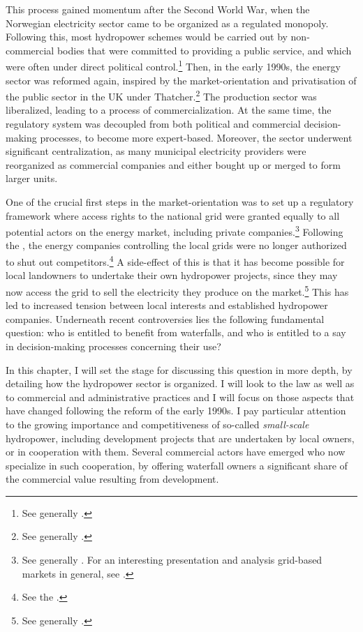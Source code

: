 This process gained momentum after the Second World War, when the Norwegian electricity sector came to be organized as a regulated monopoly. Following this, most hydropower schemes would be carried out by non-commercial bodies that were committed to providing a public service, and which were often under direct political control.\footnote{See generally \cite{skjold06}.} Then, in the early 1990s, the energy sector was reformed again, inspired by the market-orientation and privatisation of the public sector in the UK under Thatcher.\footnote{See generally \cite{midttun98}.} The production sector was liberalized, leading to a process of commercialization. At the same time, the regulatory system was decoupled from both political and commercial decision-making processes, to become more expert-based. Moreover, the sector underwent significant centralization, as many municipal electricity providers were reorganized as commercial companies and either bought up or merged to form larger units.

One of the crucial first steps in the market-orientation was to set up a regulatory framework where access rights to the national grid were granted equally to all potential actors on the energy market, including private companies.\footnote{See generally \cite{hammer96}. For an interesting presentation and analysis grid-based markets in general, see \cite{falch04}.} Following the \cite{ea90}, the energy companies controlling the local grids were no longer authorized to shut out competitors.\footnote{See the \cite[3-4]{ea90}.} A side-effect of this is that it has become possible for local landowners to undertake their own hydropower projects, since they may now access the grid to sell the electricity they produce on the market.\footnote{See generally \cite{larsen06,larsen08,larsen12}.} This has led to increased tension between local interests and established hydropower companies. Underneath recent controversies lies the following fundamental question: who is entitled to benefit from waterfalls, and who is entitled to a say in decision-making processes concerning their use?

In this chapter, I will set the stage for discussing this question in more depth, by detailing how the hydropower sector is organized. I will look to the law as well as to commercial and administrative practices and I will focus on those aspects that have changed following the reform of the early 1990s. I pay particular attention to the growing importance and competitiveness of so-called {\it small-scale} hydropower, including development projects that are undertaken by local owners, or in cooperation with them. Several commercial actors have emerged who now specialize in such cooperation, by offering waterfall owners a significant share of the commercial value resulting from development. 

